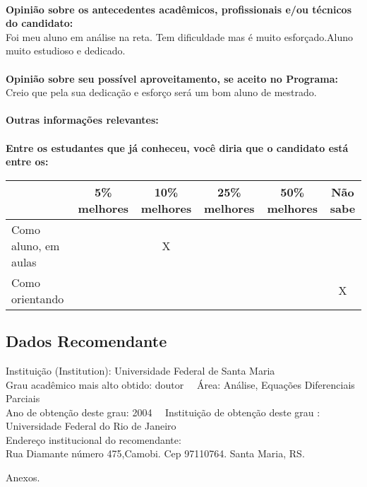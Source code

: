 \documentclass[11pt]{article}
\begin{document}
\\
\textbf{Opinião sobre os antecedentes acadêmicos, profissionais e/ou técnicos do candidato:}
\\Foi meu aluno em análise na reta. Tem dificuldade mas é muito esforçado.Aluno muito estudioso e dedicado.\\
\\
\textbf{Opinião sobre seu possível aproveitamento, se aceito no Programa:}
\\Creio que pela sua dedicação e esforço será um bom aluno de mestrado.\\ 
\\
\textbf{Outras informações relevantes:} \\
\\[0.3cm]
\textbf{Entre os estudantes que já conheceu, você diria que o candidato está entre os:}
\\
\begin{tabular}{|l|c|c|c|c|c|}
\hline
 & 5\% melhores & 10\% melhores & 25\% melhores & 50\% melhores & Não sabe \\
\hline
Como aluno, em aulas &  & X &  &  & \\
\hline
Como orientando &  &  &  &  & X\\
\hline
\end{tabular}
\subsection*{Dados Recomendante} 
	Instituição (Institution): Universidade Federal de Santa Maria
\\ 
	Grau acadêmico mais alto obtido: doutor
	\ \ Área: Análise,  Equações Diferenciais Parciais 
	\\
	Ano de obtenção deste grau: 2004
	\ \ 
	Instituição de obtenção deste grau : Universidade Federal do Rio de Janeiro
	\\ 
	Endereço institucional do recomendante: \\ Rua Diamante número 475,Camobi. Cep 97110764. Santa Maria, RS. 
\begin{center}
Anexos.
\end{center}
\end{document}
